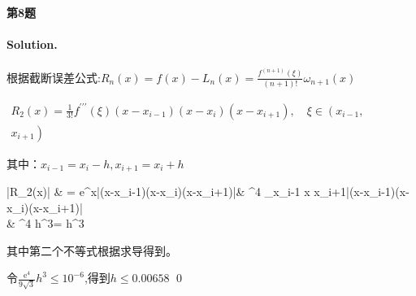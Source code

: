 \documentclass[a4paper]{article}
\newenvironment{solution}
{\color{blue} \paragraph{Solution.}}
{\newline \qed}
\begin{document}
	\paragraph{第8题}
\begin{solution}
	根据截断误差公式:$R_{n}(x)=f(x)-L_{n}(x)=\frac{f^{(n+1)}(\xi)}{(n+1) !} \omega_{n+1}(x)$

$\begin{array}{l}R_{2}(x)=\frac{1}{3 !} f^{\prime \prime \prime}(\xi)\left(x-x_{i-1}\right)\left(x-x_{i}\right)\left(x-x_{i+1}\right), \quad \xi \in\left(x_{i-1},\right. \\ \left.x_{i+1}\right)\end{array}$

	其中：$x_{i-1}=x_i-h, x_{i+1}=x_i+h$

	\begin{aligned}\left|R_{2}(x)\right| & = e^x\left|(x-x_{i-1})(x-x_i)(x-x_{i+1})\right|& \leqslant {} ^{4} \max _{x_{i-1} \leqslant x \leqslant x_{i+1}}\left|\left(x-x_{i-1}\right)\left(x-x_{i}\right)\left(x-x_{i+1}\right)\right| \\ & \leqslant {} ^{4}   h^{3}= h^{3}\end{aligned}

 其中第二个不等式根据求导得到。

 令$\frac{\mathrm{e}^{4}}{9 \sqrt{3}} h^{3}\leq10^{-6}$,得到$h\leq0.00658$
\end{solution}
\end{document}
